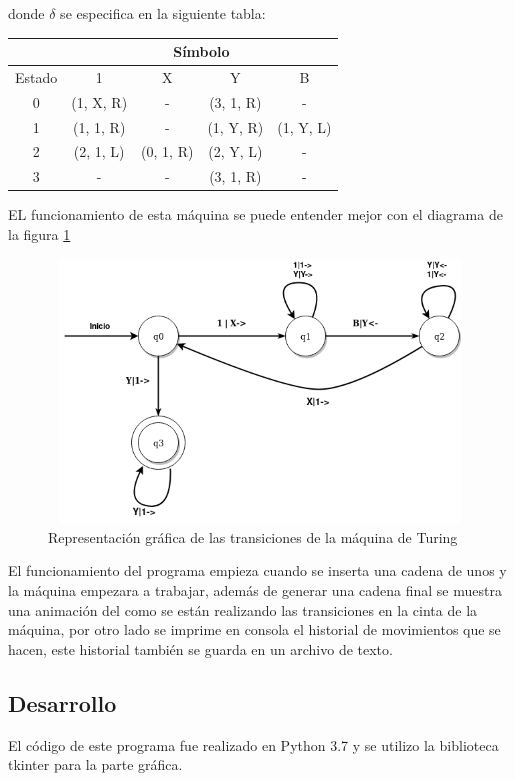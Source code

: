 donde $ \delta $ se especifica en la siguiente tabla:
\begin{center}
\begin{tabular}{|c|c|c|c|c|}
\hline
& \multicolumn{4}{|c|}{Símbolo} \\ \hline
Estado & 1 & X & Y & B\\ \hline
0 & (1, X, R) & - & (3, 1, R) & -\\ \hline
1 & (1, 1, R) & - & (1, Y, R) & (1, Y, L)\\ \hline
2 & (2, 1, L) & (0, 1, R) & (2, Y, L) & -\\ \hline
3 & - & - & (3, 1, R) & - \\ \hline
\end{tabular}
\end{center}

EL funcionamiento de esta máquina se puede entender mejor con el diagrama de la figura \ref{fig:diagrama}

\begin{figure}[H]
\begin{center}
 \includegraphics[width=12cm, height=7cm]{./img/Turing-unos.png}
 \caption{Representación gráfica de las transiciones de la máquina de Turing}
 \label{fig:diagrama}
\end{center}
\end{figure}

El funcionamiento del programa empieza cuando se inserta una cadena de unos y la máquina empezara a trabajar, además de generar una cadena final se muestra una animación del como se están realizando las transiciones en la cinta de la máquina, por otro lado se imprime en consola el historial de movimientos que se hacen, este historial también se guarda en un archivo de texto.

\subsection{Desarrollo}
El código de este programa fue realizado en Python 3.7 y se utilizo la biblioteca tkinter para la parte gráfica.

